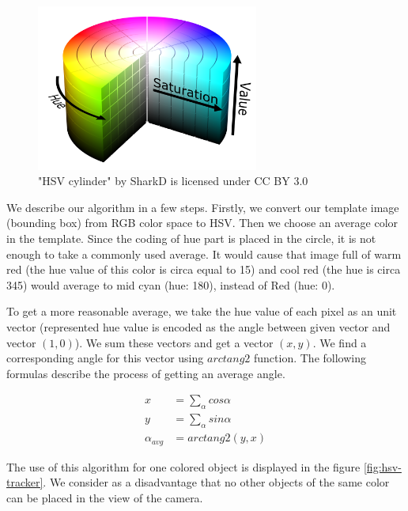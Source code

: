 \begin{figure}[h!]\centering
\includegraphics[width=0.65\textwidth]{img/hsv-cylinder.png}
\caption{"HSV cylinder" by SharkD is licensed under CC BY 3.0}
\end{figure}

We describe our algorithm in a few steps. Firstly, we convert our template
image (bounding box) from RGB color space to HSV. Then we choose an average
color in the template. Since the coding of hue part is placed in the circle, it
is not enough to take a commonly used average. It would cause that image full
of warm red (the hue value of this color is circa equal to 15) and cool red
(the hue is circa 345) would average to mid cyan (hue: 180), instead of Red
(hue: 0).

To get a more reasonable average, we take the hue value of each pixel as an
unit vector (represented hue value is encoded as the angle between given vector
and vector $(1, 0)$). We sum these vectors and get a vector $(x, y)$. We find a
corresponding angle for this vector using $arctang2$ function. The following
formulas describe the process of getting an average angle.

$$
\begin{aligned}
x &= \sum_\alpha cos \alpha \\
y &= \sum_\alpha sin \alpha \\
\alpha_{avg} &= arctang2(y, x)
\end{aligned}
$$

The use of this algorithm for one colored object is displayed in the figure
\ref{fig:hsv-tracker}. We consider as a disadvantage that no other objects of
the same color can be placed in the view of the camera.

